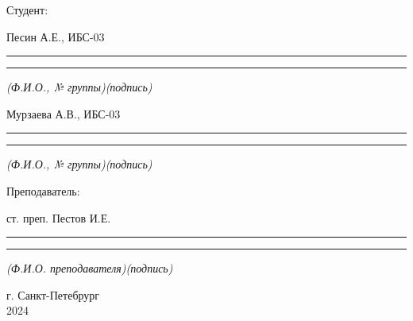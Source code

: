 \documentclass[14pt]{extreport}
\begin{document}
\begin{titlepage}
\begin{center}
    \vspace{3ex}

    \begin{flushright}
      \begin{minipage}{0.5\textwidth}
        Студент:

	\vspace{2ex}

	Песин А.Е., ИБС-03\hfill
	\vspace{-3ex}
	\rule{23ex}{0.5pt}\hfill\rule{10ex}{0.5pt}
	\vspace{-2ex}

        \begin{footnotesize}
	  \hspace{6ex}\textit{(Ф.И.О., № группы)\hfill(подпись)\hspace{3ex}}
        \end{footnotesize}

	Мурзаева А.В., ИБС-03\hfill
	\vspace{-3ex}
	\rule{23ex}{0.5pt}\hfill\rule{10ex}{0.5pt}
	\vspace{-2ex}

        \begin{footnotesize}
	  \hspace{6ex}\textit{(Ф.И.О., № группы)\hfill(подпись)\hspace{3ex}}
        \end{footnotesize}

	\vspace{2ex}

        Преподаватель:

	ст. преп. Пестов И.Е.\hfill
	\vspace{-3ex}
	\rule{23ex}{0.5pt}\hfill\rule{10ex}{0.5pt}
	\vspace{-2ex}

        \begin{footnotesize}
	  \hspace{4ex}\textit{(Ф.И.О. преподавателя)\hfill(подпись)\hspace{3ex}}
        \end{footnotesize}
      \end{minipage}
    \end{flushright}

    \vfill

    г. Санкт-Петебрург\\
    2024
  \end{center}
\end{titlepage}
\end{document}

